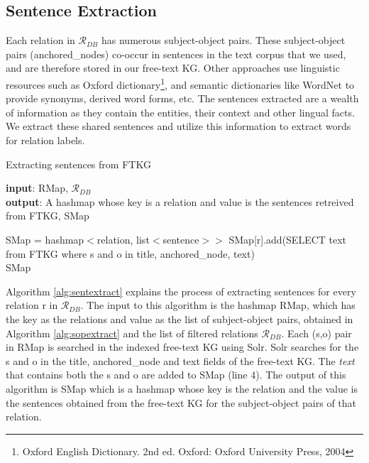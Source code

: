 \begin{sloppypar}
\subsection{Sentence Extraction}
Each relation in $\mathcal{R}_{DB}$ has numerous subject-object pairs. These subject-object pairs (anchored\_nodes) co-occur in sentences in the text corpus that we used, and are therefore stored in our free-text KG. Other approaches use linguistic resources such as Oxford dictionary\footnote{Oxford English Dictionary. 2nd ed. Oxford: Oxford University Press, 2004}, and semantic dictionaries like WordNet\cite{wordnet} to provide
synonyms, derived word forms, etc. The sentences extracted are a wealth of information as they contain the entities, their context and other lingual facts. We extract these shared sentences and utilize this information to extract words for relation labels.
\begin{singlespace}
\begin{algorithm}
\caption{Extracting sentences from FTKG}\label{alg:sentextract}
 \hspace*{\algorithmicindent} \textbf{input}: RMap, $\mathcal{R}_{DB}$ \\
 \hspace*{\algorithmicindent} \textbf{output}:  A hashmap whose key is a relation and value is the sentences retreived from FTKG, SMap
\begin{algorithmic}[1]
\State SMap = hashmap$<$relation, list$<$sentence$>>$
    \State SMap[r].add(SELECT text from FTKG where s and o in title, anchored\_node, text)
\EndFor 
\EndFor \\
\Return SMap
\end{algorithmic}
\end{algorithm}
\end{singlespace}
Algorithm \ref{alg:sentextract} explains the process of extracting sentences for every relation r in $\mathcal{R}_{DB}$. The input to this algorithm is the hashmap RMap, which has the key as the relations and value as the list of subject-object pairs, obtained in Algorithm \ref{alg:sopextract} and the list of filtered relations $\mathcal{R}_{DB}$.
Each (s,o) pair in RMap is searched in the indexed free-text KG using Solr. Solr searches for the s and o in the title, anchored\_node and text fields of the free-text KG. The \textit{text} that contains both the s and o are added to SMap (line 4). 
The output of this algorithm is SMap which is a hashmap whose key is the relation and the value is the sentences obtained from the free-text KG for the subject-object pairs of that relation. 


\end{sloppypar}
